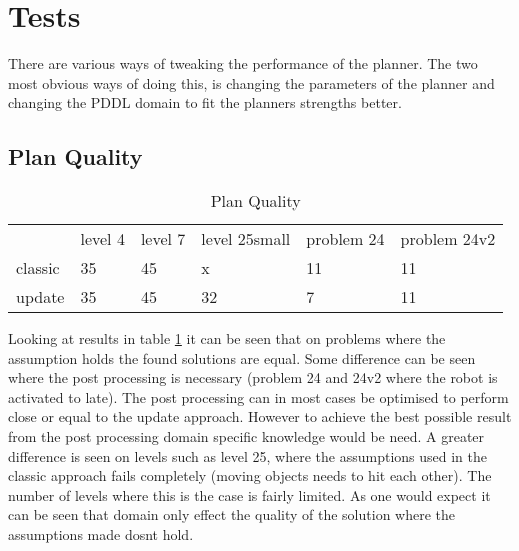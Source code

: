 \section{Tests}

%
%
%
%
%
%
%



	


	There are various ways of tweaking the performance of the planner. The two most obvious ways of doing this, is changing the parameters of the planner and changing the PDDL domain to fit the planners strengths better.

		\subsection{Plan Quality}
		
			
						\begin{table}[h]
							\centering
							\caption{Plan Quality}
							\label{quality}
							\begin{tabular}{llllll}
								& level 4 & level 7  & level 25small & problem 24 & problem 24v2\\
								classic & 35 & 45 & x&11&11\\
								update& 35 &45& 32&7&11\\
							\end{tabular}
						\end{table}
			
			Looking at results in table \ref{quality} it can be seen that on problems where the assumption holds the found solutions are equal. Some difference can be seen where the post processing is necessary (problem 24 and 24v2 where the robot is activated to late). The post processing can in most cases be optimised to perform close or equal to the update approach. However to achieve the best possible result from the post processing domain specific knowledge would be need.	A greater difference is seen on levels such as level 25, where the assumptions used in the classic approach fails completely (moving objects needs to hit each other). The number of levels where this is the case is fairly limited. As one would expect it can be seen that domain only effect the quality of the solution where the assumptions made dosnt hold.
			
